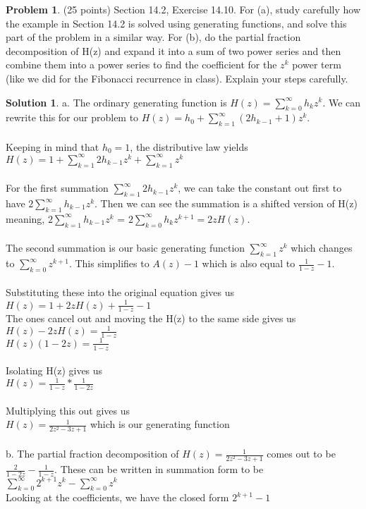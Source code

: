 \documentclass{article}
\theoremstyle{definition}
\newtheorem{problem}{Problem}
\newtheorem*{solution}{Solution}
\begin{document}
\begin{problem} (25 points) Section 14.2, Exercise 14.10.  For (a), study carefully 
how the example in Section 14.2 is solved using generating functions, and solve 
this part of the problem in a similar way.  For (b), do the partial fraction decomposition 
of H(z) and expand it into a sum of two power series and then combine them into 
a power series to find the coefficient for the $z^k$ power term (like we did for the 
Fibonacci recurrence in class).  Explain your steps carefully.
\end{problem}
\begin{solution} 
a. The ordinary generating function is $H(z) = \sum_{k=0}^{\infty} h_kz^k$. We can rewrite this for our problem to $H(z) = h_0 +  \sum_{k=1}^{\infty} (2h_{k - 1} + 1)z^k$. \\
\\
Keeping in mind that $h_0 = 1$, the distributive law yields \\
$H(z) = 1 + \sum_{k=1}^{\infty} 2h_{k - 1}z^k + \sum_{k=1}^{\infty} z^k$ \\
\\
For the first summation $\sum_{k=1}^{\infty} 2h_{k - 1}z^k$, we can take the constant out first to have $2\sum_{k=1}^{\infty} h_{k - 1}z^k$. Then we can see the summation is a shifted version of H(z) meaning, $2\sum_{k=1}^{\infty} h_{k - 1}z^k$ = $2\sum_{k=0}^{\infty} h_kz^{k + 1} = 2zH(z)$.\\
\\
The second summation is our basic generating function $\sum_{k=1}^{\infty} z^k$ which changes to $\sum_{k=0}^{\infty} z^{k + 1}$. This simplifies to $A(z) - 1$ which is also equal to $\frac{1}{1 - z} - 1$.\\
\\
Substituting these into the original equation gives us\\
$H(z) = 1 + 2zH(z) + \frac{1}{1 - z} - 1$ \\
The ones cancel out and moving the H(z) to the same side gives us \\
$H(z) - 2zH(z)= \frac{1}{1 - z}$ \\
$H(z)(1 - 2z)= \frac{1}{1 - z}$ \\
\\
Isolating H(z) gives us\\
$H(z) = \frac{1}{1 - z} * \frac{1}{1 - 2z}$\\
\\
Multiplying this out gives us \\
$H(z) = \frac{1}{2z^2 - 3z + 1}$ which is our generating function \\
\\
b. The partial fraction decomposition of $H(z) = \frac{1}{2z^2 - 3z + 1}$ comes out to be $\frac{2}{1 - 2z} - \frac{1}{1 - z}$. These can be written in summation form to be \\
$\sum_{k=0}^{\infty} 2^{k + 1}z^{k} - \sum_{k=0}^{\infty} z^{k}$ \\
Looking at the coefficients, we have the closed form $2^{k + 1} - 1$
\end{solution}
\end{document}
